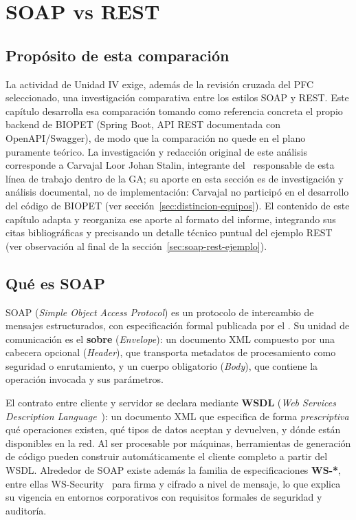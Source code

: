 \chapter{SOAP vs REST}
\label{cap:soap-vs-rest}

\section{Prop\'osito de esta comparaci\'on}
\label{sec:soap-rest-proposito}

La actividad de Unidad IV exige, adem\'as de la revisi\'on cruzada del PFC
seleccionado, una investigaci\'on comparativa entre los estilos SOAP y REST.
Este cap\'itulo desarrolla esa comparaci\'on tomando como referencia
concreta el propio backend de BIOPET (Spring Boot, API REST documentada con
OpenAPI/Swagger), de modo que la comparaci\'on no quede en el plano
puramente te\'orico. La investigaci\'on y redacci\'on original de este
an\'alisis corresponde a Carvajal Loor Johan Stalin, integrante del
\equipoga\ responsable de esta l\'inea de trabajo dentro de la GA; su aporte
en esta secci\'on es de investigaci\'on y an\'alisis documental, no de
implementaci\'on: Carvajal no particip\'o en el desarrollo del c\'odigo de
BIOPET (ver secci\'on~\ref{sec:distincion-equipos}). El contenido de este
cap\'itulo adapta y reorganiza ese aporte al formato del informe, integrando
sus citas bibliogr\'aficas y precisando un detalle t\'ecnico puntual del
ejemplo REST (ver observaci\'on al final de la
secci\'on~\ref{sec:soap-rest-ejemplo}).

\section{Qu\'e es SOAP}
\label{sec:que-es-soap}

SOAP (\emph{Simple Object Access Protocol}) es un protocolo de intercambio
de mensajes estructurados, con especificaci\'on formal publicada por el
\textcite{w3c-soap12}. Su unidad de comunicaci\'on es el \textbf{sobre}
(\emph{Envelope}): un documento XML compuesto por una cabecera opcional
(\emph{Header}), que transporta metadatos de procesamiento como seguridad o
enrutamiento, y un cuerpo obligatorio (\emph{Body}), que contiene la
operaci\'on invocada y sus par\'ametros.

El contrato entre cliente y servidor se declara mediante \textbf{WSDL}
(\emph{Web Services Description Language}~\parencite{w3c-wsdl11}): un documento
XML que especifica de forma \emph{prescriptiva} qu\'e operaciones existen,
qu\'e tipos de datos aceptan y devuelven, y d\'onde est\'an disponibles en
la red. Al ser procesable por m\'aquinas, herramientas de generaci\'on de
c\'odigo pueden construir autom\'aticamente el cliente completo a partir del
WSDL. Alrededor de SOAP existe adem\'as la familia de especificaciones
\textbf{WS-*}, entre ellas WS-Security~\parencite{oasis-ws-security} para firma y
cifrado a nivel de mensaje, lo que explica su vigencia en entornos
corporativos con requisitos formales de seguridad y auditor\'ia.

